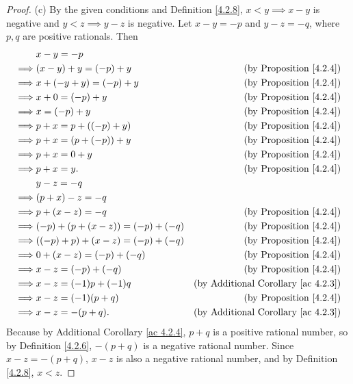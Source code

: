\begin{proof}{(c)}
By the given conditions and Definition \ref{4.2.8}, \(x < y \implies x - y\) is negative and \(y < z \implies y - z\) is negative.
Let \(x - y = -p\) and \(y - z = -q\), where \(p, q\) are positive rationals.
Then
\begin{align*}
& x - y = -p \\
\implies & (x - y) + y = (-p) + y & \text{(by Proposition \ref{4.2.4})} \\
\implies & x + (-y + y) = (-p) + y & \text{(by Proposition \ref{4.2.4})} \\
\implies & x + 0 = (-p) + y & \text{(by Proposition \ref{4.2.4})} \\
\implies & x = (-p) + y & \text{(by Proposition \ref{4.2.4})} \\
\implies & p + x = p + ((-p) + y) & \text{(by Proposition \ref{4.2.4})} \\
\implies & p + x = (p + (-p)) + y & \text{(by Proposition \ref{4.2.4})} \\
\implies & p + x = 0 + y & \text{(by Proposition \ref{4.2.4})} \\
\implies & p + x = y. & \text{(by Proposition \ref{4.2.4})} \\
& y - z = -q \\
\implies & (p + x) - z = -q \\
\implies & p + (x - z) = -q & \text{(by Proposition \ref{4.2.4})} \\
\implies & (-p) + (p + (x - z)) = (-p) + (-q) & \text{(by Proposition \ref{4.2.4})} \\
\implies & ((-p) + p) + (x - z) = (-p) + (-q) & \text{(by Proposition \ref{4.2.4})} \\
\implies & 0 + (x - z) = (-p) + (-q) & \text{(by Proposition \ref{4.2.4})} \\
\implies & x - z = (-p) + (-q) & \text{(by Proposition \ref{4.2.4})} \\
\implies & x - z = (-1)p + (-1)q & \text{(by Additional Corollary \ref{ac 4.2.3})} \\
\implies & x - z = (-1)(p + q) & \text{(by Proposition \ref{4.2.4})} \\
\implies & x - z = -(p + q). & \text{(by Additional Corollary \ref{ac 4.2.3})}
\end{align*}
Because by Additional Corollary \ref{ac 4.2.4}, \(p + q\) is a positive rational number, so by Definition \ref{4.2.6}, \(-(p + q)\) is a negative rational number.
Since \(x - z = -(p + q)\), \(x - z\) is also a negative rational number, and by Definition \ref{4.2.8}, \(x < z\).
\end{proof}

